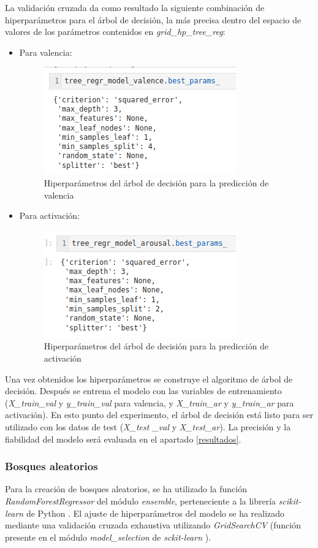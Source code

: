 \documentclass[12pt,a4paper,Spanish]{article}
\begin{document}
La validación cruzada da como resultado la siguiente combinación de hiperparámetros para el árbol de decisión, la más precisa dentro del espacio de valores de los parámetros contenidos en \textit{grid\_hp\_tree\_reg}:
\begin{itemize}
	\item Para valencia:
	\begin{figure}[H]
		\centering
		\includegraphics[width=0.5\linewidth]{figs/final_params_tree}
		\caption{Hiperparámetros del árbol de decisión para la predicción de valencia}
		\label{fig:finalparamstree}
	\end{figure}
	\item Para activación:
	\begin{figure}[H]
		\centering
		\includegraphics[width=0.5\linewidth]{figs/final_params_tree_arousal}
		\caption{Hiperparámetros del árbol de decisión para la predicción de activación}
		\label{fig:finalparamstreearousal}
	\end{figure}
\end{itemize}
Una vez obtenidos los hiperparámetros se construye el algoritmo de árbol de decisión. Después se entrena el modelo con las variables de entrenamiento (\textit{X\_train\_val} y \textit{y\_train\_val} para valencia, y \textit{X\_train\_ar} y \textit{y\_train\_ar} para activación).
\newline
En esto punto del experimento, el árbol de decisión está listo para ser utilizado con los datos de test (\textit{X\_test \_val} y \textit{X\_test\_ar}). La precisión y la fiabilidad del modelo será evaluada en el apartado \ref{resultados}.

\subsubsection{Bosques aleatorios}
Para la creación de bosques aleatorios, se ha utilizado la función \textit{RandomForestRegressor} del módulo \textit{ensemble}, perteneciente a la librería \textit{scikit-learn} de Python \cite{scikit-learn}.
\newline
El ajuste de hiperparámetros del modelo se ha realizado mediante una validación cruzada exhaustiva utilizando \textit{GridSearchCV} (función presente en el módulo \textit{model\_selection} de \textit{sckit-learn} \cite{scikit-learn}).
\end{document}

